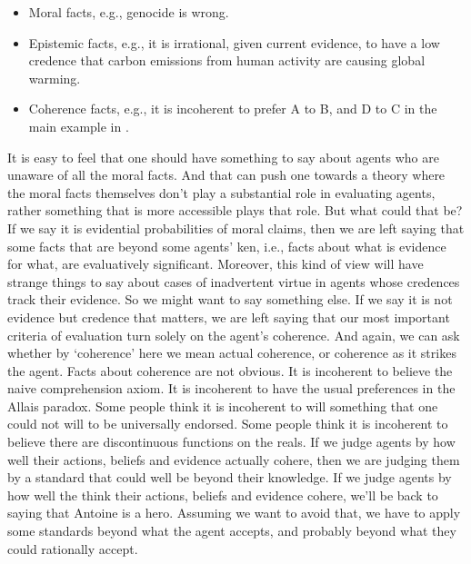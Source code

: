 \begin{itemize}
\item{} Moral facts, e.g., genocide is wrong.

\item{} Epistemic facts, e.g., it is irrational, given current evidence, to have a low credence that carbon emissions from human activity are causing global warming.

\item{} Coherence facts, e.g., it is incoherent to prefer A to B, and D to C in the main example in \citet{Allais1953}.

\end{itemize}
It is easy to feel that one should have something to say about agents who are unaware of all the moral facts. And that can push one towards a theory where the moral facts themselves don't play a substantial role in evaluating agents, rather something that is more accessible plays that role. But what could that be? If we say it is evidential probabilities of moral claims, then we are left saying that some facts that are beyond some agents' ken, i.e., facts about what is evidence for what, are evaluatively significant. Moreover, this kind of view will have strange things to say about cases of inadvertent virtue in agents whose credences track their evidence. So we might want to say something else. If we say it is not evidence but credence that matters, we are left saying that our most important criteria of evaluation turn solely on the agent's coherence. And again, we can ask whether by `coherence' here we mean actual coherence, or coherence as it strikes the agent. Facts about coherence are not obvious. It is incoherent to believe the naive comprehension axiom. It is incoherent to have the usual preferences in the Allais paradox. Some people think it is incoherent to will something that one could not will to be universally endorsed. Some people think it is incoherent to believe there are discontinuous functions on the reals. If we judge agents by how well their actions, beliefs and evidence actually cohere, then we are judging them by a standard that could well be beyond their knowledge. If we judge agents by how well the think their actions, beliefs and evidence cohere, we'll be back to saying that \gls{Antoine} is a hero. Assuming we want to avoid that, we have to apply some standards beyond what the agent accepts, and probably beyond what they could rationally accept.

